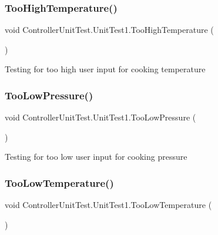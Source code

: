 \subsubsection{\texorpdfstring{Too\+High\+Temperature()}{TooHighTemperature()}}
{\footnotesize\ttfamily void Controller\+Unit\+Test.\+Unit\+Test1.\+Too\+High\+Temperature (\begin{DoxyParamCaption}{ }\end{DoxyParamCaption})\hspace{0.3cm}{\ttfamily [inline]}}



Testing for too high user input for cooking temperature 

\mbox{\label{class_controller_unit_test_1_1_unit_test1_a83cb8833e8eba5a8ca87257234602e6e}} 
\subsubsection{\texorpdfstring{Too\+Low\+Pressure()}{TooLowPressure()}}
{\footnotesize\ttfamily void Controller\+Unit\+Test.\+Unit\+Test1.\+Too\+Low\+Pressure (\begin{DoxyParamCaption}{ }\end{DoxyParamCaption})\hspace{0.3cm}{\ttfamily [inline]}}



Testing for too low user input for cooking pressure 

\mbox{\label{class_controller_unit_test_1_1_unit_test1_a7bdcd66725dc66a60616781b47d4cf11}} 
\subsubsection{\texorpdfstring{Too\+Low\+Temperature()}{TooLowTemperature()}}
{\footnotesize\ttfamily void Controller\+Unit\+Test.\+Unit\+Test1.\+Too\+Low\+Temperature (\begin{DoxyParamCaption}{ }\end{DoxyParamCaption})\hspace{0.3cm}{\ttfamily [inline]}}



